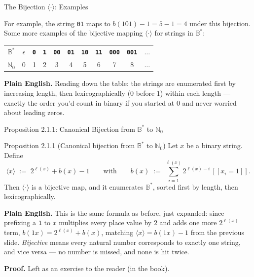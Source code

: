\documentclass[aspectratio=169,10pt]{beamer}
\newcommand{\Bs}{\mathbb{B}^{*}}
\newcommand{\len}{\ell}
\newcommand{\bij}[1]{\langle #1\rangle}
\begin{document}
\begin{frame}{The Bijection $\bij{\cdot}$: Examples}

For example, the string \texttt{01} maps to $b(101)-1 = 5-1 = 4$ under this
bijection. Some more examples of the bijective mapping $\bij{\cdot}$ for
strings in $\Bs$:

\begin{center}
\begin{tabular}{c|c|c|c|c|c|c|c|c|c|c}
$\Bs$ & $\epsilon$ & \texttt{0} & \texttt{1} & \texttt{00} & \texttt{01} &
  \texttt{10} & \texttt{11} & \texttt{000} & \texttt{001} & $\dots$ \\
\hline
$\mathbb{N}_0$ & 0 & 1 & 2 & 3 & 4 & 5 & 6 & 7 & 8 & $\dots$
\end{tabular}
\end{center}

\textbf{Plain English.} Reading down the table: the strings are enumerated
first by increasing length, then lexicographically ($0$ before $1$) within
each length --- exactly the order you'd count in binary if you started at
$0$ and never worried about leading zeros.
\end{frame}

\begin{frame}{Proposition 2.1.1: Canonical Bijection from $\Bs$ to $\mathbb{N}_0$}

\begin{block}{Proposition 2.1.1 (Canonical bijection from $\Bs$ to $\mathbb{N}_0$)}
Let $x$ be a binary string. Define
\[
  \bij{x} \;:=\; 2^{\len(x)} + b(x) - 1 \qquad\text{with}\qquad
  b(x) \;:=\; \sum_{i=1}^{\len(x)} 2^{\len(x)-i}\,[\![x_i=1]\!].
\]
Then $\bij{\cdot}$ is a bijective map, and it enumerates $\Bs$, sorted
first by length, then lexicographically.
\end{block}

\textbf{Plain English.} This is the same formula as before, just expanded:
since prefixing a \texttt{1} to $x$ multiplies every place value by $2$ and
adds one more $2^{\len(x)}$ term, $b(1x)=2^{\len(x)}+b(x)$, matching
$\bij{x}=b(1x)-1$ from the previous slide. \emph{Bijective} means every
natural number corresponds to exactly one string, and vice versa --- no
number is missed, and none is hit twice.

\medskip
\textbf{Proof.} Left as an exercise to the reader (in the book).
\end{frame}
\end{document}
